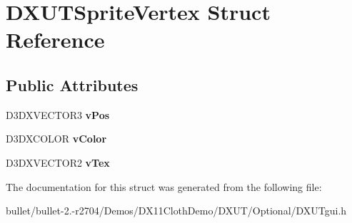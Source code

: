 \hypertarget{struct_d_x_u_t_sprite_vertex}{\section{D\+X\+U\+T\+Sprite\+Vertex Struct Reference}
\label{struct_d_x_u_t_sprite_vertex}
}
\subsection*{Public Attributes}
\begin{DoxyCompactItemize}
\item 
\hypertarget{struct_d_x_u_t_sprite_vertex_a50be96c4bfce98e3a8850126dc037084}{D3\+D\+X\+V\+E\+C\+T\+O\+R3 {\bfseries v\+Pos}}\label{struct_d_x_u_t_sprite_vertex_a50be96c4bfce98e3a8850126dc037084}

\item 
\hypertarget{struct_d_x_u_t_sprite_vertex_ad1c0aec3b0e23f292e6c8dcb548183dd}{D3\+D\+X\+C\+O\+L\+O\+R {\bfseries v\+Color}}\label{struct_d_x_u_t_sprite_vertex_ad1c0aec3b0e23f292e6c8dcb548183dd}

\item 
\hypertarget{struct_d_x_u_t_sprite_vertex_a4e25e25c5da284c6326b11bda0b9063c}{D3\+D\+X\+V\+E\+C\+T\+O\+R2 {\bfseries v\+Tex}}\label{struct_d_x_u_t_sprite_vertex_a4e25e25c5da284c6326b11bda0b9063c}

\end{DoxyCompactItemize}


The documentation for this struct was generated from the following file\+:\begin{DoxyCompactItemize}
\item 
bullet/bullet-\/2.-\/r2704/\+Demos/\+D\+X11\+Cloth\+Demo/\+D\+X\+U\+T/\+Optional/D\+X\+U\+Tgui.\+h\end{DoxyCompactItemize}
